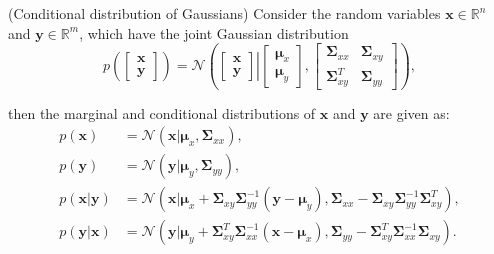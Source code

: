 \documentclass[a4paper,11pt]{book}
\numberwithin{figure}{chapter}
\numberwithin{equation}{chapter}
\numberwithin{table}{chapter}
\newtheorem{lemma}[theorem]{Lemma}
\theoremstyle{definition}
\newcounter{boxed-theorem}
\newcounter{boxed-lemma}
\newenvironment{boxed-lemma}[1]
{\colorlet{shadecolor}{pastelPurple!10} \begin{shaded} \begin{lemma}{#1}}
{\end{lemma} \end{shaded}}
\newcounter{boxed-definition}
\newcounter{boxed-example}
\begin{document}
\begin{boxed-lemma}{(Conditional distribution of Gaussians)} \label{le:condGauss}
	Consider the random variables $\bm{x} \in \mathbb{R}^n$ and $\bm{y} \in \mathbb{R}^m$, which have the joint Gaussian distribution
	\begin{equation}
		p\left( \begin{bmatrix} \bm{x} \\ \bm{y} \end{bmatrix} \right) = \mathcal{N}\left( \left. \begin{bmatrix} \bm{x} \\ \bm{y} \end{bmatrix} \right| \begin{bmatrix} \bm{\mu}_{x} \\ \bm{\mu}_{y} \end{bmatrix}, \begin{bmatrix} \bm{\Sigma}_{xx} & \bm{\Sigma}_{xy} \\ \bm{\Sigma}_{xy}^T & \bm{\Sigma}_{yy} \end{bmatrix} \right),
	\end{equation}
	
	\noindent then the marginal and conditional distributions of $\bm{x}$ and $\bm{y}$ are given as:
	\begin{equation}
	\begin{split}
		p(\bm{x}) &= \mathcal{N}(\bm{x} | \bm{\mu}_{x}, \bm{\Sigma}_{xx}), \\
		p(\bm{y}) &= \mathcal{N}(\bm{y} | \bm{\mu}_{y}, \bm{\Sigma}_{yy}), \\
		p(\bm{x}|\bm{y}) &= \mathcal{N}(\bm{x} | \bm{\mu}_x + \bm{\Sigma}_{xy} \bm{\Sigma}_{yy}^{-1} (\bm{y} - \bm{\mu}_y), \bm{\Sigma}_{xx} - \bm{\Sigma}_{xy} \bm{\Sigma}_{yy}^{-1} \bm{\Sigma}_{xy}^T), \\
		p(\bm{y}|\bm{x}) &= \mathcal{N}(\bm{y} | \bm{\mu}_y + \bm{\Sigma}_{xy}^T \bm{\Sigma}_{xx}^{-1} (\bm{x} - \bm{\mu}_x), \bm{\Sigma}_{yy} - \bm{\Sigma}_{xy}^T \bm{\Sigma}_{xx}^{-1} \bm{\Sigma}_{xy}).
	\end{split}
	\end{equation}
\end{boxed-lemma}

\end{document}
